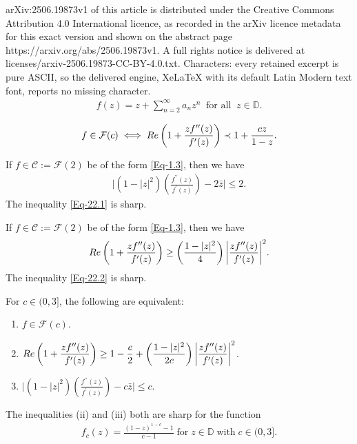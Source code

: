 \documentclass[10pt,a4paper]{amsart}
\begin{document}
arXiv:2506.19873v1 of this article is distributed under the Creative Commons Attribution 4.0 International licence, as recorded in the arXiv licence metadata for this exact version and shown on the abstract page https://arxiv.org/abs/2506.19873v1. A full rights notice is delivered at licenses/arxiv-2506.19873-CC-BY-4.0.txt. Characters: every retained excerpt is pure ASCII, so the delivered engine, XeLaTeX with its default Latin Modern text font, reports no missing character.
\begin{align}\label{Eq-1.3}
	f(z)=z+\sum_{n=2}^{\infty}a_nz^n\;\; \mbox{for all}\;\; z\in\mathbb{D}.
\end{align}

\begin{align}\label{Eq-1.5}
	f\in\mathcal{F}(c)\iff{\rm Re  }\left(1+\frac{zf^{\prime\prime}(z)}{f^{\prime}(z)}\right)\prec1+\frac{cz}{1-z}.
\end{align}

\begin{cor}\label{Cor-2.1}
	If $f\in \mathcal{C} := \mathcal{F}(2)$ be of the form \eqref{Eq-1.3}, then we have
	\begin{align}\label{Eq-22.1}
		\bigg|	(1-|z|^2)\left(\frac{f^{\prime\prime}(z)}{f^{\prime}(z)}\right)-2\bar{z}\bigg|\leq 2.
	\end{align}
	The inequality \eqref{Eq-22.1} is sharp. 
\end{cor}

\begin{cor}\label{Cor-2.2}
	If $f\in \mathcal{C} := \mathcal{F}(2)$ be of the form \eqref{Eq-1.3}, then we have
	\begin{align}\label{Eq-22.2}
		{\rm Re  }\left(1+\frac{zf^{\prime\prime}(z)}{f^{\prime}(z)}\right)\geq\left(\frac{1-|z|^2}{4}\right)\bigg|\frac{zf^{\prime\prime}(z)}{f^{\prime}(z)}\bigg|^2.
	\end{align}
	The inequality \eqref{Eq-22.2} is sharp. 
\end{cor}

\begin{thm}\label{Th-2.1} For $c\in(0,3]$, the following are equivalent:
	\begin{enumerate}
		\item[{(i)}] $f\in\mathcal{F}(c)$.\vspace{2mm}
		
		\item[{(ii)}] $\displaystyle
			{\rm Re  }\left(1+\frac{zf^{\prime\prime}(z)}{f^{\prime}(z)}\right)\geq1-\frac{c}{2}+\left(\frac{1-|z|^2}{2c}\right)\bigg|\frac{zf^{\prime\prime}(z)}{f^{\prime}(z)}\bigg|^2$.\vspace{2mm}
		
		\item[{(iii)}] $\displaystyle\bigg|	(1-|z|^2)\left(\frac{f^{\prime\prime}(z)}{f^{\prime}(z)}\right)-c\bar{z}\bigg|\leq c.
		$
	\end{enumerate} The inequalities {(ii)} and {(iii)} both are sharp for the function
	\begin{align}\label{Eq-22.11}
		f_{c}(z)=\frac{(1-z)^{1-c}-1}{c-1}\; \mbox{for}\; z\in\mathbb{D}\; \mbox{with}\; c\in(0,3].
	\end{align}
\end{thm}
\end{document}
